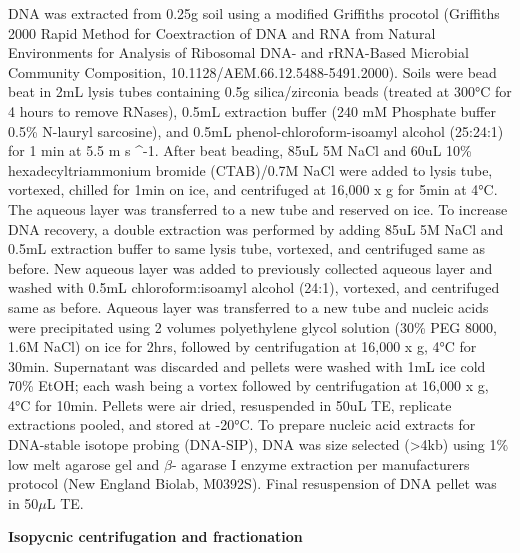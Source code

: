 DNA was extracted from 0.25g soil using a modified Griffiths procotol (Griffiths 2000 Rapid Method for Coextraction of DNA and RNA from Natural Environments for Analysis of Ribosomal DNA- and rRNA-Based Microbial Community Composition, 10.1128/AEM.66.12.5488-5491.2000).  Soils were bead beat in 2mL lysis tubes containing 0.5g silica/zirconia beads (treated at 300°C for 4 hours to remove RNases), 0.5mL extraction buffer (240 mM Phosphate buffer
0.5\% N-lauryl sarcosine), and 0.5mL phenol-chloroform-isoamyl alcohol (25:24:1) for 1 min at 5.5 m s ^{-1}.  After beat beading, 85uL 5M NaCl and 60uL 10\% hexadecyltriammonium bromide (CTAB)/0.7M NaCl were added to lysis tube, vortexed, chilled for 1min on ice, and centrifuged at 16,000 x g for 5min at 4°C.  The aqueous layer was transferred to a new tube and reserved on ice.  To increase DNA recovery, a double extraction was performed by adding 85uL 5M NaCl and 0.5mL extraction buffer to same lysis tube, vortexed, and centrifuged same as before.  New aqueous layer was added to previously collected aqueous layer and washed with 0.5mL chloroform:isoamyl alcohol (24:1), vortexed, and centrifuged same as before.  Aqueous layer was transferred to a new tube and nucleic acids were precipitated using 2 volumes polyethylene glycol solution (30\% PEG 8000, 1.6M NaCl) on ice for 2hrs, followed by centrifugation at 16,000 x g, 4°C for 30min.  Supernatant was discarded and pellets were washed with 1mL ice cold 70\% EtOH; each wash being a vortex followed by centrifugation at 16,000 x g, 4°C for 10min.  Pellets were air dried, resuspended in 50uL TE, replicate extractions pooled, and stored at -20°C. To prepare nucleic acid extracts for DNA-stable isotope probing (DNA-SIP), DNA was size selected (>4kb) using 1\% low melt agarose gel and $\beta$- agarase I enzyme extraction per manufacturers protocol (New England Biolab, M0392S).  Final resuspension of DNA pellet was in 50$\mu$L TE.   


\textbf{Isopycnic centrifugation and fractionation}

